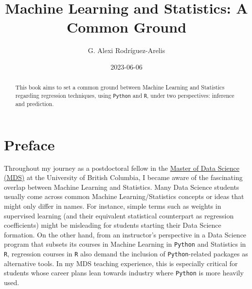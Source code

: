 \documentclass[
  letterpaper,
  DIV=11,
  numbers=noendperiod]{scrreprt}
\title{Machine Learning and Statistics: A Common Ground}
\author{G. Alexi Rodríguez-Arelis}
\date{2023-06-06}
\renewcommand*\contentsname{Table of contents}
\newcommand\contentsname{Table of contents}
\begin{document}
\maketitle
\begin{abstract}
This book aims to set a common ground between Machine Learning and
Statistics regarding regression techniques, using \texttt{Python} and
\texttt{R}, under two perspectives: inference and prediction.
\end{abstract}
\ifdefined\Shaded\renewenvironment{Shaded}{\begin{tcolorbox}[breakable, borderline west={3pt}{0pt}{shadecolor}, frame hidden, boxrule=0pt, interior hidden, sharp corners, enhanced]}{\end{tcolorbox}}\fi

\renewcommand*\contentsname{Table of contents}
{
\hypersetup{linkcolor=}
\setcounter{tocdepth}{2}
\tableofcontents
}

\hypertarget{preface}{%
\chapter*{Preface}\label{preface}}


Throughout my journey as a postdoctoral fellow in the
\href{https://masterdatascience.ubc.ca/}{Master of Data Science (MDS)}
at the University of British Columbia, I became aware of the fascinating
overlap between Machine Learning and Statistics. Many Data Science
students usually come across common Machine Learning/Statistics concepts
or ideas that might only differ in names. For instance, simple terms
such as weights in supervised learning (and their equivalent statistical
counterpart as regression coefficients) might be misleading for students
starting their Data Science formation. On the other hand, from an
instructor's perspective in a Data Science program that subsets its
courses in Machine Learning in \texttt{Python} and Statistics in
\texttt{R}, regression courses in \texttt{R} also demand the inclusion
of \texttt{Python}-related packages as alternative tools. In my MDS
teaching experience, this is especially critical for students whose
career plans lean towards industry where \texttt{Python} is more heavily
used.
\end{document}
